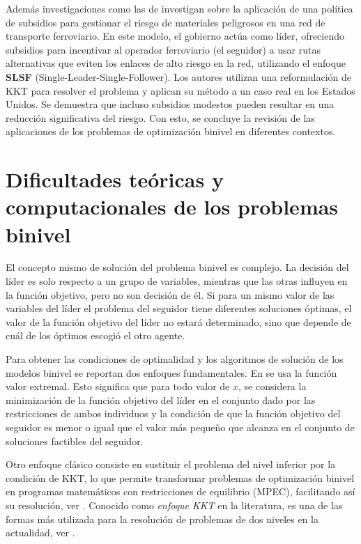 Además investigaciones como las de \cite{Bhavsar2021ASP} investigan sobre la aplicación de una política de subsidios para gestionar el riesgo de materiales peligrosos en una red de transporte ferroviario. En este modelo, el gobierno actúa como líder, ofreciendo subsidios para incentivar al operador ferroviario (el seguidor) a usar rutas alternativas que eviten los enlaces de alto riesgo en la red, utilizando el enfoque \textbf{SLSF} (Single-Leader-Single-Follower). Los autores utilizan una reformulación de KKT para resolver el problema y aplican su método a un caso real en los Estados Unidos. Se demuestra que incluso subsidios modestos pueden resultar en una reducción significativa del riesgo.
Con esto, se concluye la revisión de las aplicaciones de los problemas de optimización binivel en diferentes contextos.

\section{Dificultades teóricas y computacionales de los problemas binivel}
El concepto mismo de solución del problema binivel es complejo. La decisión del líder es solo respecto a un grupo de variables, mientras que las otras influyen en la función objetivo, pero no son decisión de él. Si para un mismo valor de las variables del líder el problema del seguidor tiene diferentes soluciones óptimas, el valor de la función objetivo del líder no estará determinado, sino que depende de cuál de los óptimos escogió el otro agente. 

Para obtener las condiciones de optimalidad y los algoritmos de solución de los modelos binivel se reportan dos enfoques fundamentales. En \cite{DempeyZemkoho2020} se usa la función valor extremal. 
Esto significa que para todo valor de $x$, se considera la minimización de la función objetivo del líder en el conjunto dado por las restricciones de ambos individuos y la condición de que la función objetivo del seguidor es menor o igual que el valor más pequeño que alcanza en el conjunto de soluciones factibles del seguidor.
 
Otro enfoque clásico consiste en sustituir el problema del nivel inferior por la condición de KKT, lo que permite transformar problemas de optimización binivel en programas matemáticos con restricciones de equilibrio (MPEC), facilitando así su resolución, ver \cite{AnnotatedBibliographyDempe,Caselli2024BilevelOW,DempeyZemkoho2020}.
Conocido como \textit{enfoque KKT} en la literatura, es una de las formas más utilizada para la resolución de problemas de dos niveles en la actualidad, ver \cite{Aussel2021GenericityAO}.


